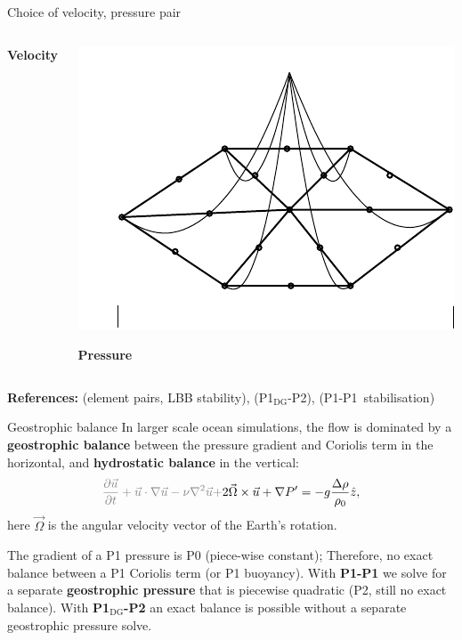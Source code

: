 \documentclass[12pt]{beamer}
\newcommand\pp[2]{\frac{\partial #1}{\partial #2}}
\newcommand\ppt[1]{\pp{#1}t}
\newcommand\grad\nabla
\newcommand\poo{P1-P1}
\newcommand\podgpt{P1$_{\text{DG}}$-P2}
\renewcommand\emph[1]{{\bf #1}}
\begin{document}
\begin{frame}{Choice of velocity, pressure pair}
\begin{columns}
\begin{column}{0.25\textwidth}
      \bf\centering\tiny Velocity
    \end{column}
    \begin{column}{0.25\textwidth}
      \includegraphics[width=\textwidth,clip,trim=0 20 0 0]{P2cgshapefunction2d_tex}

      \bf\centering\tiny Pressure
    \end{column}
  \end{columns}
  \vspace{0.5em}

  \footnotesize
  {\bf References:} \citet{Gresho1998} (element pairs, LBB stability),
  \citet{Cotter2009} (\podgpt),
  \citet{Pain2005} (\poo\ stabilisation)
\end{frame}

\begin{frame}{Geostrophic balance}
  \small
  In larger scale ocean simulations, the flow is dominated by a
  \emph{geostrophic balance} between the pressure gradient and
  Coriolis term in the horizontal, and \emph{hydrostatic balance}
  in the vertical: 
  \begin{equation*}
    {\color{gray}
    \ppt{\vec u} + \vec u\cdot\grad\vec u - \nu \nabla^2 \vec u + }
      2\vec \Omega \times \vec u
      + \grad P' = -g \frac{\Delta \rho}{\rho_0} \hat z,
    \end{equation*}
    here $\vec\Omega$ is the angular velocity vector of the Earth's
    rotation.

    \vspace{1em}
    The gradient of a P1 pressure is P0 (piece-wise constant); Therefore,
    no exact balance between a P1 Coriolis term (or P1 buoyancy). With
    \emph{\poo} we
    solve for a separate \emph{geostrophic pressure} that is piecewise
    quadratic (P2, still no exact balance). With \emph{\podgpt} an exact balance
    is possible without a separate
    geostrophic pressure solve.
\end{frame}
\end{document}
